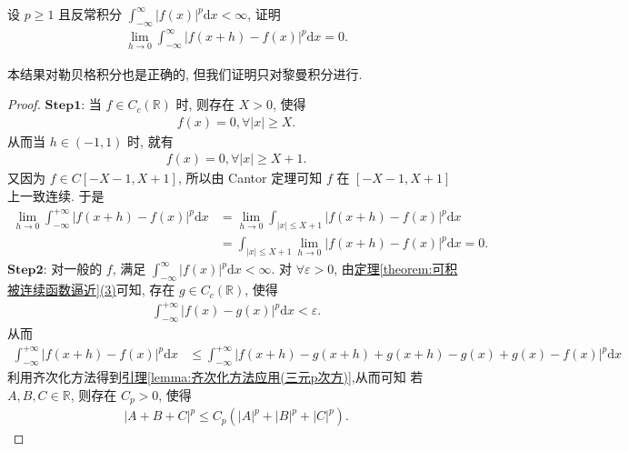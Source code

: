 \documentclass[../../main.tex]{subfiles}%
\begin{document}
\begin{theorem}[积分的绝对连续性]\label{theorem:积分的绝对连续性11111111}
设 $p \geqslant 1$ 且反常积分 $\int_{-\infty}^{\infty} |f(x)|^{p}\mathrm{d}x < \infty$, 证明
\begin{align}
\lim_{h \to 0} \int_{-\infty}^{\infty} |f(x + h) - f(x)|^{p}\mathrm{d}x = 0. \label{theorem-equation-积分的绝对连续性-13.118}
\end{align}
\end{theorem}
\begin{note}
本结果对勒贝格积分也是正确的, 但我们证明只对黎曼积分进行.
\end{note}
\begin{proof}
$\mathbf{Step}\mathbf{1}$: 当 $f\in C_c(\mathbb{R})$ 时, 则存在 $X>0$, 使得
\begin{align*}
f(x) = 0, \forall |x| \geqslant X.
\end{align*}
从而当 $h\in (-1,1)$ 时, 就有
\begin{align*}
f(x) = 0, \forall |x| \geqslant X + 1.
\end{align*}
又因为 $f\in C[-X - 1,X + 1]$, 所以由 Cantor 定理可知 $f$ 在 $[-X - 1,X + 1]$ 上一致连续. 于是
\begin{align*}
\lim_{h\rightarrow 0} \int_{-\infty}^{+\infty} |f(x + h) - f(x)|^p \mathrm{d}x &= \lim_{h\rightarrow 0} \int_{|x| \leqslant X + 1} |f(x + h) - f(x)|^p \mathrm{d}x \\
&= \int_{|x| \leqslant X + 1} \lim_{h\rightarrow 0} |f(x + h) - f(x)|^p \mathrm{d}x = 0.
\end{align*}
$\mathbf{Step}\mathbf{2}$: 对一般的 $f$, 满足 $\int_{-\infty}^{\infty} |f(x)|^p \mathrm{d}x < \infty$. 对 $\forall \varepsilon > 0$, 由\hyperref[theorem:可积被连续函数逼近]{定理\ref{theorem:可积被连续函数逼近}(3)}可知, 存在 $g\in C_c(\mathbb{R})$, 使得
\begin{align*}
\int_{-\infty}^{+\infty} |f(x) - g(x)|^p \mathrm{d}x < \varepsilon.
\end{align*}
从而
\begin{align*}
\int_{-\infty}^{+\infty} |f(x + h) - f(x)|^p \mathrm{d}x &\leqslant \int_{-\infty}^{+\infty} |f(x + h) - g(x + h) + g(x + h) - g(x) + g(x) - f(x)|^p \mathrm{d}x
\end{align*}
利用齐次化方法得到\hyperref[lemma:齐次化方法应用(三元p次方)]{引理\ref{lemma:齐次化方法应用(三元p次方)}},从而可知 若 $A,B,C\in \mathbb{R}$, 则存在 $C_p>0$, 使得
\begin{align*}
|A + B + C|^p \leqslant C_p(|A|^p + |B|^p + |C|^p).
\end{align*}

\end{proof}
\end{document}
